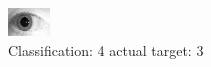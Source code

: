 \begin{figure}[h!]
\begin{center}
\includegraphics[width=0.60\columnwidth]{figures/ID1814_class_4_target_3.png}
\end{center}
\caption{ Classification: 4 actual target: 3}
\label{fig:ID1814_class_4_target_3}
\end{figure}
